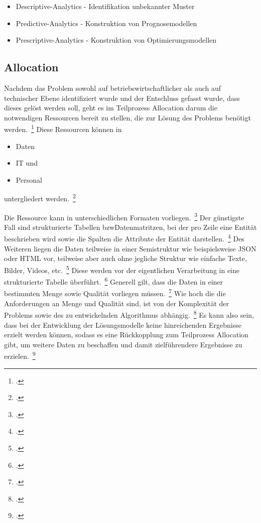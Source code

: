 \begin{itemize}
    \item Descriptive-Analytics - Identifikation unbekannter Muster
    \item Predictive-Analytics - Konstruktion von Prognosemodellen
    \item Prescriptive-Analytics - Konstruktion von Optimierungsmodellen
\end{itemize}

\subsection{Allocation} \label{sec: t_Allocation}

Nachdem das Problem sowohl auf betriebswirtschaftlicher als auch auf technischer Ebene identifiziert wurde und der
Entschluss gefasst wurde, dass dieses gelöst werden soll, geht es im Teilprozess Allocation darum die notwendigen
Ressourcen bereit zu stellen, die zur Lösung des Problems benötigt werden.~\footcite[\vglf][]{seiter.2019}
Diese Ressourcen können in
\begin{itemize}
    \item Daten
    \item IT und
    \item Personal
\end{itemize}
untergliedert werden.~\footcite[\vglf][]{seiter.2019}

Die Ressource \grqq kann in unterschiedlichen Formaten vorliegen.~\footcite[\vglf][]{seiter.2019}
Der günstigste Fall sind strukturierte Tabellen bzw\. Datenmatritzen, bei der pro Zeile eine Entität beschrieben wird
sowie die Spalten die Attribute der Entität darstellen.~\footcite[\vglf][]{seiter.2019}
Des Weiteren liegen die Daten teilweise in einer Semistruktur wie beispielsweise JSON oder HTML vor, teilweise aber auch
ohne jegliche Struktur wie einfache Texte, Bilder, Videos, etc.~\footcite[\vglf][-38]{cleve.2016}
Diese werden vor der eigentlichen Verarbeitung in eine strukturierte Tabelle überführt.~\footcite[\vglf][]{seiter.2019}
Generell gilt, dass die Daten in einer bestimmten Menge sowie Qualität vorliegen müssen.~\footcite[\vglf][]{seiter.2019}
Wie hoch die die Anforderungen an Menge und Qualität sind, ist von der Komplexität der Problems sowie des zu entwickelnden
Algorithmus abhängig.~\footcite[\vglf][]{seiter.2019}
Es kann also sein, dass bei der Entwicklung der Lösungsmodelle keine hinreichenden Ergebnisse erzielt werden können,
sodass es eine Rückkopplung zum Teilprozess Allocation gibt, um weitere Daten zu beschaffen und damit zielführendere
Ergebnisse zu erzielen.~\footcite[\vglf][]{seiter.2019}\\

